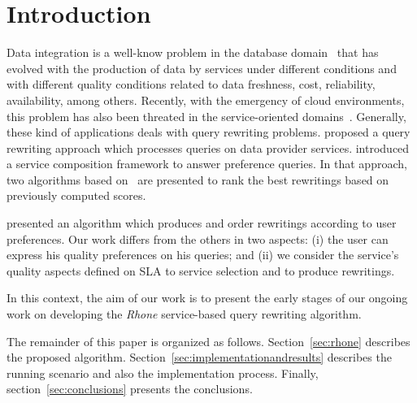 \section{Introduction}
Data integration is a well-know problem in the database domain~\cite{Halevy:2001} that has evolved with the production of data by  services under different conditions and with different quality conditions  related to data freshness, cost, reliability, availability, among others. 
Recently, with the emergency of cloud environments, this problem has also been threated in the service-oriented domains~\cite{Barhamgi2010,Benouaret2011,ba2014}.
Generally, these kind of applications deals with query rewriting problems.
\cite{Barhamgi2010} proposed a query rewriting approach which processes queries on data provider services. \cite{Benouaret2011} introduced a service composition framework to answer preference queries. In that approach, two algorithms based on~\cite{Barhamgi2010} are presented to rank the best rewritings based on previously computed scores.

\cite{ba2014} presented an algorithm which produces and order rewritings according to user preferences.
Our work differs from the others in two aspects: (i) the user can express his
quality preferences on his queries; and (ii) we consider the service's quality
aspects defined on SLA to service selection and to produce rewritings.    

In this context, the aim of our work is to present the early stages of our
ongoing work on developing the \textit{Rhone} service-based query rewriting
algorithm.

The remainder of this paper is organized as follows. Section~\ref{sec:rhone}
describes the proposed algorithm. Section~\ref{sec:implementationandresults} describes
the running scenario and also the implementation process.
Finally, section~\ref{sec:conclusions} presents the conclusions.
